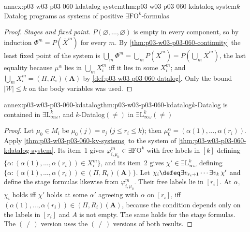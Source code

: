 \begin{annexitem}{annex:p03-w03-p03-060-kdatalog-system}{thm:p03-w03-p03-060-kdatalog-system}{\(k\)-Datalog programs as systems of positive \(\exists\mathrm{FO}^k\)-formulas}
\begin{proof}
\emph{Stages and fixed point.} \(P(\varnothing,\ldots,\varnothing)\) is
empty in every component, so by induction
\(\Phi^m=P(\bar X^m)\) for every \(m\). By
\cref{thm:p03-w03-p03-060-continuity} the least fixed point of the system
is \(\bigcup_m\Phi^m=\bigcup_mP(\bar X^m)=P(\bigcup_m\bar X^m)\), the last
equality because \(\mu^\alpha\) lies in \(\bigcup_mX^m_i\) iff it lies in
some \(X^m_i\); and \(\bigcup_mX^m_i=(\Pi,R_i)(\mathbf A)\) by
\cref{def:p03-w03-p03-060-datalog}. Only the bound \(|W|\le k\) on the body
variables was used.
\end{proof}
\end{annexitem}

\begin{annexitem}{annex:p03-w03-p03-060-kdatalog}{thm:p03-w03-p03-060-kdatalog}{\(k\)-Datalog is contained in \(\exists\mathrm{L}^k_{\infty\omega}\), and \(k\)-Datalog\((\neq)\) in \(\exists\mathrm{L}^k_{\infty\omega}(\neq)\)}
\begin{proof}
Let \(\mu_0\in M_i\) be \(\mu_0(j)=v_j\) (\(j\le r_i\le k\)); then
\(\mu_0^\alpha=(\alpha(1),\ldots,\alpha(r_i))\). Apply
\cref{thm:p03-w03-p03-060-kv-systems} to the system of
\cref{thm:p03-w03-p03-060-kdatalog-system}. Its item~1 gives
\(\varphi^m_{i,\mu_0}\in\exists\mathrm{FO}^k\) with free labels in \([k]\)
defining \(\{\alpha:(\alpha(1),\ldots,\alpha(r_i))\in X^m_i\}\), and its
item~2 gives \(\chi'\in\exists\mathrm{L}^k_{\infty\omega}\) defining
\(\{\alpha:(\alpha(1),\ldots,\alpha(r_i))\in(\Pi,R_i)(\mathbf A)\}\). Let
\(\chi_i\defeq\exists v_{r_i+1}\cdots\exists v_k\,\chi'\) and define the
stage formulas likewise from \(\varphi^m_{i,\mu_0}\). Their free labels lie
in \([r_i]\). At \(\alpha\), \(\chi_i\) holds iff \(\chi'\) holds at some
\(\alpha'\) agreeing with \(\alpha\) on \([r_i]\), iff
\((\alpha(1),\ldots,\alpha(r_i))\in(\Pi,R_i)(\mathbf A)\), because the
condition depends only on the labels in \([r_i]\) and \(A\) is not empty.
The same holds for the stage formulas. The \((\neq)\) version uses the
\((\neq)\) versions of both results.
\end{proof}
\end{annexitem}

